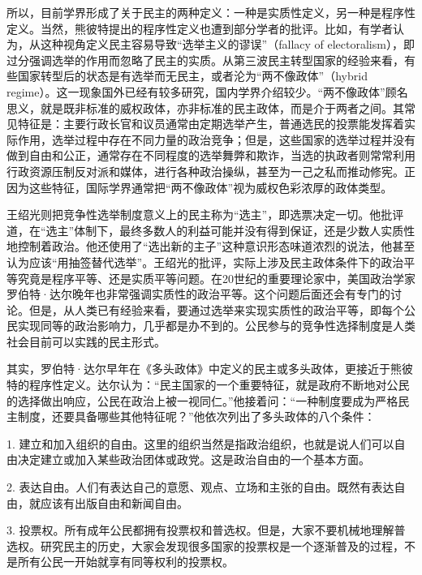 所以，目前学界形成了关于民主的两种定义：一种是实质性定义，另一种是程序性定义。当然，熊彼特提出的程序性定义也遭到部分学者的批评。比如，有学者认为，从这种视角定义民主容易导致“选举主义的谬误”（fallacy of electoralism），即过分强调选举的作用而忽略了民主的实质。从第三波民主转型国家的经验来看，有些国家转型后的状态是有选举而无民主，或者沦为“两不像政体”（hybrid regime）。这一现象国外已经有较多研究，国内学界介绍较少。“两不像政体”顾名思义，就是既非标准的威权政体，亦非标准的民主政体，而是介于两者之间。其常见特征是：主要行政长官和议员通常由定期选举产生，普通选民的投票能发挥着实际作用，选举过程中存在不同力量的政治竞争；但是，这些国家的选举过程并没有做到自由和公正，通常存在不同程度的选举舞弊和欺诈，当选的执政者则常常利用行政资源压制反对派和媒体，进行各种政治操纵，甚至为一己之私而推动修宪。正因为这些特征，国际学界通常把“两不像政体”视为威权色彩浓厚的政体类型。

王绍光则把竞争性选举制度意义上的民主称为“选主”，即选票决定一切。他批评道，在“选主”体制下，最终多数人的利益可能并没有得到保证，还是少数人实质性地控制着政治。他还使用了“选出新的主子”这种意识形态味道浓烈的说法，他甚至认为应该“用抽签替代选举”。王绍光的批评，实际上涉及民主政体条件下的政治平等究竟是程序平等、还是实质平等问题。在20世纪的重要理论家中，美国政治学家罗伯特·达尔晚年也非常强调实质性的政治平等。这个问题后面还会有专门的讨论。但是，从人类已有经验来看，要通过选举来实现实质性的政治平等，即每个公民实现同等的政治影响力，几乎都是办不到的。公民参与的竞争性选择制度是人类社会目前可以实践的民主形式。

其实，罗伯特·达尔早年在《多头政体》中定义的民主或多头政体，更接近于熊彼特的程序性定义。达尔认为：“民主国家的一个重要特征，就是政府不断地对公民的选择做出响应，公民在政治上被一视同仁。”他接着问：“一种制度要成为严格民主制度，还要具备哪些其他特征呢？”他依次列出了多头政体的八个条件：

1. 建立和加入组织的自由。这里的组织当然是指政治组织，也就是说人们可以自由决定建立或加入某些政治团体或政党。这是政治自由的一个基本方面。

2. 表达自由。人们有表达自己的意愿、观点、立场和主张的自由。既然有表达自由，就应该有出版自由和新闻自由。

3. 投票权。所有成年公民都拥有投票权和普选权。但是，大家不要机械地理解普选权。研究民主的历史，大家会发现很多国家的投票权是一个逐渐普及的过程，不是所有公民一开始就享有同等权利的投票权。


